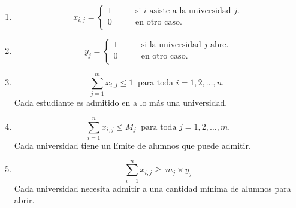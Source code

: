 \begin{enumerate}
\item \begin{equation} \label{r1}
x_{i,j}= 
\begin{cases}
1 & \qquad \text{si $i$ asiste a la universidad $j$.} \\
0 &\qquad\text{en otro caso.}\ \\ 
\end{cases} \end{equation}
\item \begin{equation} y_{j}= 
\begin{cases}
1 & \qquad \text{si la universidad $j$ abre.} \\
0 &\qquad\text{en otro caso.} \\ 
\end{cases} \end{equation}
\item \begin{equation} \label{r2}
\sum_{j=1}^{m}x_{i,j} \leq1 \ \text{ para toda $i=1,2,\ldots,n$. }
\end{equation} Cada estudiante es admitido en a lo más una universidad. 
\item \begin{equation} \label{r3}
\sum_{i=1}^{n} x_{i,j} \leq M_j\ \text{ para toda $j=1,2,\dots,m$.} 
\end{equation}
Cada universidad tiene un límite de alumnos que puede admitir.
\item \begin{equation} \label{r4}
\sum_{i=1}^{n} x_{i,j} \geq\ m_j\times y_j 
\end{equation}
Cada universidad necesita admitir a una cantidad mínima de alumnos para abrir.


\end{enumerate}

